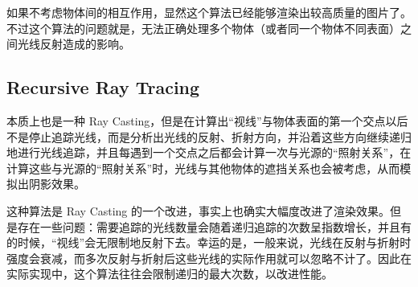\documentclass[12pt]{ctexart}
\begin{document}
    如果不考虑物体间的相互作用，显然这个算法已经能够渲染出较高质量的图片了。不过这个算法的问题就是，无法正确处理多个物体（或者同一个物体不同表面）之间光线反射造成的影响。

    \subsection{Recursive Ray Tracing}

    本质上也是一种 Ray Casting，但是在计算出``视线''与物体表面的第一个交点以后不是停止追踪光线，而是分析出光线的反射、折射方向，并沿着这些方向继续递归地进行光线追踪，并且每遇到一个交点之后都会计算一次与光源的``照射关系''，在计算这些与光源的``照射关系''时，光线与其他物体的遮挡关系也会被考虑，从而模拟出阴影效果。

    这种算法是 Ray Casting 的一个改进，事实上也确实大幅度改进了渲染效果。但是存在一些问题：需要追踪的光线数量会随着递归追踪的次数呈指数增长，并且有的时候，``视线''会无限制地反射下去。幸运的是，一般来说，光线在反射与折射时强度会衰减，而多次反射与折射后这些光线的实际作用就可以忽略不计了。因此在实际实现中，这个算法往往会限制递归的最大次数，以改进性能。
\end{document}
